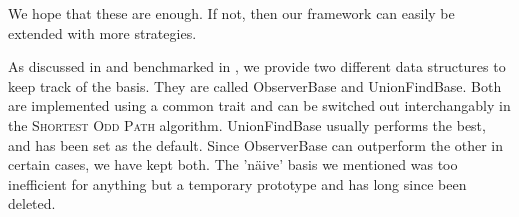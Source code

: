 We hope that these are enough. If not, then our framework can easily be extended with more strategies.

As discussed in  and benchmarked in , we provide two different data structures to keep track of the basis. They are called ObserverBase and UnionFindBase. Both are implemented using a common trait and can be switched out interchangably in the \textsc{Shortest Odd Path} algorithm. UnionFindBase usually performs the best, and has been set as the default. Since ObserverBase can outperform the other in certain cases, we have kept both. The 'näive' basis we mentioned was too inefficient for anything but a temporary prototype and has long since been deleted.
